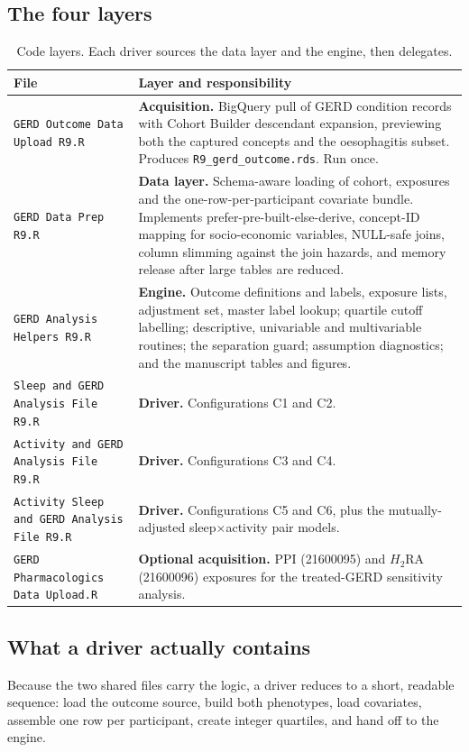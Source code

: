 \documentclass[11pt]{article}
\newcommand{\code}[1]{\texttt{\small #1}}
\begin{document}
\subsection{The four layers}
\begin{table}[h]\centering\footnotesize
\begin{tabular}{@{}p{4.9cm}p{8.7cm}@{}}
\toprule
\textbf{File} & \textbf{Layer and responsibility} \\
\midrule
\code{GERD Outcome Data Upload R9.R} & \textbf{Acquisition.} BigQuery pull of GERD condition records
with Cohort Builder descendant expansion, previewing both the captured concepts and the oesophagitis
subset. Produces \code{R9_gerd_outcome.rds}. Run once. \\
\addlinespace
\code{GERD Data Prep R9.R} & \textbf{Data layer.} Schema-aware loading of cohort, exposures and the
one-row-per-participant covariate bundle. Implements prefer-pre-built-else-derive, concept-ID mapping
for socio-economic variables, NULL-safe joins, column slimming against the join hazards, and memory
release after large tables are reduced. \\
\addlinespace
\code{GERD Analysis Helpers R9.R} & \textbf{Engine.} Outcome definitions and labels, exposure lists,
adjustment set, master label lookup; quartile cutoff labelling; descriptive, univariable and
multivariable routines; the separation guard; assumption diagnostics; and the manuscript tables and
figures. \\
\addlinespace
\code{Sleep and GERD Analysis File R9.R} & \textbf{Driver.} Configurations C1 and C2. \\
\code{Activity and GERD Analysis File R9.R} & \textbf{Driver.} Configurations C3 and C4. \\
\code{Activity Sleep and GERD Analysis File R9.R} & \textbf{Driver.} Configurations C5 and C6, plus
the mutually-adjusted sleep$\times$activity pair models. \\
\addlinespace
\code{GERD Pharmacologics Data Upload.R} & \textbf{Optional acquisition.} PPI (21600095) and
$H_2$RA (21600096) exposures for the treated-GERD sensitivity analysis. \\
\bottomrule
\end{tabular}
\caption{Code layers. Each driver sources the data layer and the engine, then delegates.}
\label{tab:layers}
\end{table}

\subsection{What a driver actually contains}
Because the two shared files carry the logic, a driver reduces to a short, readable sequence: load the
outcome source, build both phenotypes, load covariates, assemble one row per participant, create
integer quartiles, and hand off to the engine.
\end{document}
